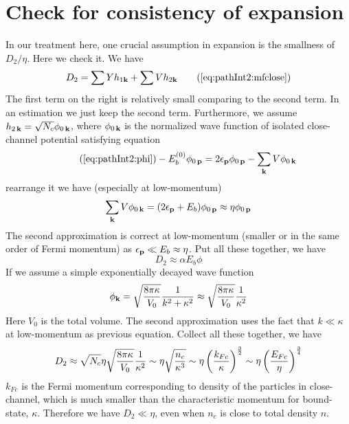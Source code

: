 \section{Check for consistency of expansion\label{sec:pathApp:consistency}}
In our treatment here, one crucial assumption in expansion is the smallness of $D_{2}/\eta$.  Here we check it.  We have 
\begin{equation}
D_{2}=\sum{}Yh_{1\vk}+\sum{}Vh_{2\vk}\tag{\ref{eq:pathInt2:mfclose}}
\end{equation}
The first term on the right is relatively small comparing to the second term.  In an estimation we just keep the second term.  Furthermore,  we assume $h_{2\,\mathbf{k}}=\sqrt{N_{c}}\phi_{0\,\mathbf{k}}$, where $\phi_{0\,\mathbf{k}}$ is the normalized wave function of isolated close-channel potential satisfying \sch equation
\begin{equation}\tag{\ref{eq:pathInt2:phi}}
-E_{b}^{(0)}\phi_{0\,\vp}=2\epsilon_{\vp}\phi_{0\,\vp}-\sum_{\vk}V \phi_{0\,\vk}
\end{equation}
rearrange it we have (especially at low-momentum)
\begin{equation*}
\sum_{\mathbf{k}}V \phi_{0\,\mathbf{k}}=(2\epsilon_{\mathbf{p}}+E_{b})\phi_{0\,\mathbf{p}}\approx{\eta}\phi_{0\,\mathbf{p}}
\end{equation*}
The second approximation is correct at low-momentum (smaller or in the same order of Fermi momentum) as $\epsilon_{\mathbf{p}}\ll{}E_{b}\approx\eta$.  Put all these together, we have
\begin{equation*}
D_{2}\approx\alpha{}E_{b}\phi
\end{equation*}
If we assume a simple exponentially decayed wave function
\begin{equation}\label{eq:pathInt2:phi2body}
\phi_{\mathbf{k}}=\sqrt{\frac{8\pi\kappa}{V_{0}}}\frac{1}{k^{2}+\kappa^{2}}\approx\sqrt{\frac{8\pi\kappa}{V_{0}}}\frac{1}{\kappa^{2}}
\end{equation}
Here  $V_{0}$ is the total volume.  The second approximation uses the fact that $k\ll\kappa$ at low-momentum as previous equation.  Collect all these together, we have
\begin{equation}
D_{2}\approx\sqrt{N_{c}}\eta\sqrt{\frac{8\pi\kappa}{V_{0}}}\frac{1}{\kappa^{2}}
\sim\eta\sqrt\frac{n_{c}}{\kappa^{3}}
\sim\eta\left(\frac{k_{Fc}}{\kappa}\right)^{\frac{3}{2}}
\sim\eta\left(\frac{E_{Fc}}{\eta}\right)^{\frac{3}{4}}
\end{equation}
$k_{Fc}$ is the Fermi momentum corresponding to density of the particles in close-channel, which is much smaller than the characteristic momentum for bound-state, $\kappa$.   Therefore we have $D_{2}\ll\eta$, even when $n_{c}$ is close to total density $n$. 

